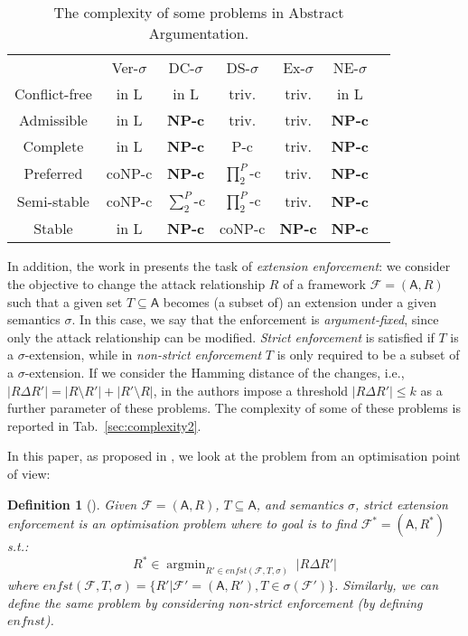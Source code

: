 \documentclass[conference]{IEEEtran}
\newtheorem{definition}{Definition}
\DeclareMathOperator*{\argmin}{argmin}
\newcommand{\F}{\ensuremath{\mathcal{F}}\xspace} %
\newcommand{\args}{\ensuremath{\mathsf{A}}\xspace} %
\newcommand{\atts}{\ensuremath{R}\xspace}
\begin{document}
\begin{table}[t]
	\centering
	\footnotesize
	\begin{tabular}{ccccccc}
		&  Ver-$\sigma$ &  DC-$\sigma$ & DS-$\sigma$ & Ex-$\sigma$ &
		NE-$\sigma$  \\
		Conflict-free & in L & in L & triv.& triv. & in L  \\
		Admissible & in L  & \bf{NP-c} & triv. & triv. &  \bf{NP-c}  \\
		Complete & in L &  \bf{NP-c} & P-c & triv. &  \bf{NP-c}  \\
		Preferred & coNP-c &  \bf{NP-c} & $\prod^{P}_{2}$-c& triv. &  \bf{NP-c} \\
		Semi-stable & coNP-c & $\sum^{P}_{2}$-c & $\prod^{P}_{2}$-c & triv. &  \bf{NP-c}  \\
		Stable & in L &  \bf{NP-c} & coNP-c &  \bf{NP-c} &  \bf{NP-c} \\
	\end{tabular}
	\caption{The complexity of some  problems in Abstract Argumentation.}
	\label{sec:complexity}
	\vspace{-0.5cm}
\end{table}

In addition, the work in \cite{extenf1} presents the task of \emph{extension enforcement}: we consider the objective to change the attack relationship $\atts$ of a framework $\F=(\args,\atts)$ such that a given set $T \subseteq \args$ becomes (a subset of) an extension under a given semantics $\sigma$. In this case, we say that the enforcement is \emph{argument-fixed}, since only the attack relationship can be modified. \emph{Strict enforcement} is satisfied if $T$ is a $\sigma$-extension, while in \emph{non-strict enforcement} $T$ is only required to be a subset of a $\sigma$-extension. If we consider the Hamming distance of the changes, i.e., $|R \Delta R'| = |R\setminus R'|+|R'\setminus R|$, in \cite{extenf1} the authors impose a threshold $|R \Delta R'| \leq k$ as a further parameter of these problems. The complexity of some of these problems is reported in Tab.~\ref{sec:complexity2}.

In this paper, as proposed in \cite{extenf}, we look at the problem from an optimisation point of view:

\begin{definition}[\cite{extenf}]
Given $\F=(\args,\atts)$, $T \subseteq \args$, and semantics $\sigma$, strict extension enforcement is an optimisation problem where to goal is to find $\F^\ast=(\args,\atts^\ast)$ s.t.:
$$\atts^\ast \in \argmin_{R' \in \mathit{enfst}(\F, T, \sigma)} \; |R \Delta R'|$$
\noindent where $\mathit{enfst}(\F, T, \sigma)= \{\atts' | \F' =(\args,\atts'), T \in \sigma(\F')\}$. Similarly, we can define the same problem by considering non-strict enforcement (by defining $\mathit{enfnst}$).
\end{definition}
\end{document}
